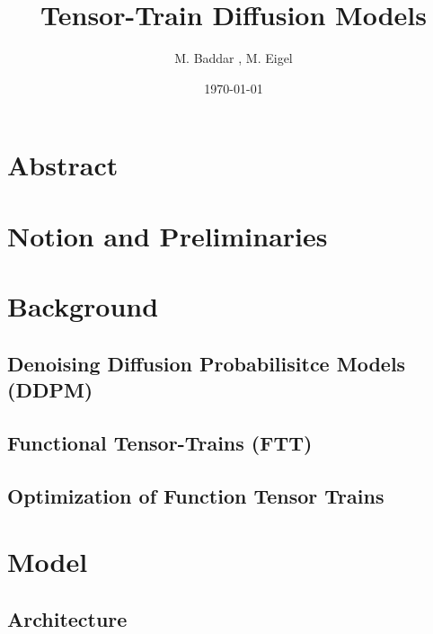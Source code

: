 \documentclass[11pt]{article}
\title{Tensor-Train Diffusion Models }
\author{M. Baddar , M. Eigel}
\date{\today}
\begin{document}
    \maketitle


    \section{Abstract}\label{sec:abstract}
    

    \section{Notion and Preliminaries}\label{sec:notioan-and-preliminarities}
    


    \section{Background}\label{sec:background}

    \subsection{Denoising Diffusion Probabilisitce Models (DDPM)}\label{subsec:ddpm}
    

    \subsection{Functional Tensor-Trains (FTT)}\label{subsec:functional-tensor-trains}
    

    \subsection{Optimization of Function Tensor Trains}\label{subsec:optimization-of-function-tensor-trains}
    



    \section{Model}\label{sec:proposed-model}

    \subsection{Architecture}\label{subsec:architecture}
    
\end{document}
